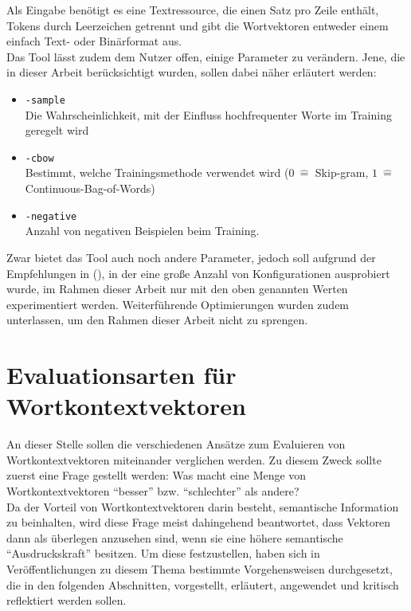   Als Eingabe benötigt es eine Textressource, die einen Satz pro Zeile enthält, Tokens durch Leerzeichen getrennt und gibt die Wortvektoren
  entweder einem einfach Text- oder Binärformat aus.\\
  Das Tool lässt zudem dem Nutzer offen, einige Parameter zu verändern. Jene, die in dieser Arbeit berücksichtigt wurden, sollen
  dabei näher erläutert werden:
  \begin{itemize}
    \item \verb|-sample|\\Die Wahrscheinlichkeit, mit der Einfluss hochfrequenter Worte im Training geregelt wird
    \item \verb|-cbow|\\Bestimmt, welche Trainingsmethode verwendet wird ($0\ \hat{=}$ Skip-gram, $1\ \hat{=}$ Continuous-Bag-of-Words)
    \item \verb|-negative|\\Anzahl von negativen Beispielen beim Training.
  \end{itemize}

  Zwar bietet das Tool auch noch andere Parameter, jedoch soll aufgrund der Empfehlungen in (\citeauthor{levy2015improving}), in
  der eine große Anzahl von Konfigurationen ausprobiert wurde, im Rahmen dieser Arbeit nur mit den oben genannten Werten experimentiert werden.
  Weiterführende Optimierungen wurden zudem unterlassen, um den Rahmen dieser Arbeit nicht zu sprengen.


\section{Evaluationsarten für Wortkontextvektoren}\label{sec:we-eval}

An dieser Stelle sollen die verschiedenen Ansätze zum Evaluieren von Wortkontextvektoren miteinander verglichen werden. Zu diesem Zweck sollte zuerst eine Frage gestellt werden:
Was macht eine Menge von Wortkontextvektoren ``besser'' bzw. ``schlechter'' als andere?\\
Da der Vorteil von Wortkontextvektoren darin besteht, semantische Information zu beinhalten, wird diese
Frage meist dahingehend beantwortet, dass Vektoren dann als überlegen anzusehen sind, wenn sie
eine höhere semantische ``Ausdruckskraft'' besitzen. Um diese festzustellen, haben sich in Veröffentlichungen
zu diesem Thema bestimmte Vorgehensweisen durchgesetzt, die in den folgenden Abschnitten, vorgestellt, erläutert,
angewendet und kritisch reflektiert werden sollen.\\

